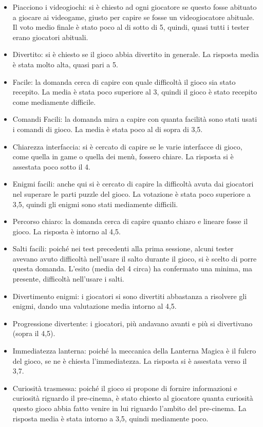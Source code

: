 \begin{itemize}

\item Piacciono i videogiochi: si è chiesto ad ogni giocatore se questo fosse abituato a giocare ai videogame, giusto per capire se fosse un videogiocatore abituale. Il voto medio finale è stato poco al di sotto di 5, quindi, quasi tutti i tester erano giocatori abituali.
\item Divertito: si è chiesto se il gioco abbia divertito in generale. La risposta media è stata molto alta, quasi pari a 5.
\item Facile: la domanda cerca di capire con quale difficoltà il gioco sia stato recepito. La media è stata poco superiore al 3, quindi il gioco è stato recepito come mediamente difficile.
\item Comandi Facili: la domanda mira a capire con quanta facilità sono stati usati i comandi di gioco. La media è stata poco al di sopra di 3,5.
\item Chiarezza interfaccia: si è cercato di capire se le varie interfacce di gioco, come quella in game o quella dei menù, fossero chiare. La risposta si è assestata poco sotto il 4.
\item Enigmi facili: anche qui si è cercato di capire la difficoltà avuta dai giocatori nel superare le parti puzzle del gioco. La votazione è stata poco superiore a 3,5, quindi gli enigmi sono stati mediamente difficili.
\item Percorso chiaro:  la domanda cerca di capire quanto chiaro e lineare fosse il gioco. La risposta è intorno al 4,5.
\item Salti facili: poiché nei test precedenti alla prima sessione, alcuni tester avevano avuto difficoltà nell'usare il salto durante il gioco, si è scelto di porre questa domanda. L'esito (media del 4 circa) ha confermato una minima, ma presente, difficoltà nell'usare i salti. 
\item Divertimento enigmi: i giocatori si sono divertiti abbastanza a risolvere gli enigmi, dando una valutazione media intorno al 4,5.
\item Progressione divertente: i giocatori, più andavano avanti e più si divertivano (sopra il 4,5).
\item Immediatezza lanterna: poiché la meccanica della Lanterna Magica è il fulcro del gioco, se ne è chiesta l'immediatezza. La risposta si è assestata verso il 3,7.
\item Curiosità trasmessa: poiché il gioco si propone di fornire informazioni e curiosità riguardo il pre-cinema, è stato chiesto al giocatore quanta curiosità questo gioco abbia fatto venire in lui riguardo l'ambito del pre-cinema. La risposta media è stata intorno a 3,5, quindi mediamente poco.

\end{itemize}
